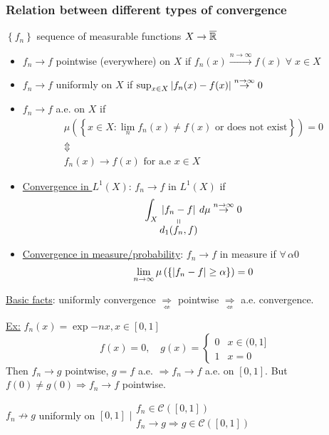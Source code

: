 \subsubsection*{Relation between different types of convergence}
\(\left\lbrace f_n \right\rbrace\) sequence of measurable functions \(X \to \barreal\)
\begin{itemize}
    \item \(f_n \to f\) pointwise (everywhere) on \(X\) if \(f_n(x) \overset{n \to \infty}{\to} f(x) \; \forall \; x \in X\)
    \item \(f_n \to f\) uniformly on \(X\) if \(\sup_{x \in X} \abs{f_n(x) - f(x)} \overset{n \to \infty}{\to} 0\)
    \item \(f_n \to f\) a.e. on \(X\) if 
    \[
        \begin{array}{c}
            \mu\left(\left\{ x \in X : \lim_n f_n(x) \neq f(x) \mbox{ or does not exist} \right\}\right) = 0 \\
            \Updownarrow \\
            f_n(x) \to f(x) \mbox{ for a.e } x \in X
        \end{array}
    \]
    \item \underline{Convergence in \(L^1(X)\)}: \(f_n \to f\) in \(L^1(X)\) if 
    \[
        \int_X \stackbelow{\abs{f_n - f}}{d_1(f_n, f)} \, d\mu \overset{n\to \infty}{\to} 0
    \]
    \item \underline{Convergence in measure/probability}: \(f_n \to f\) in measure if \(\forall \, \alpha 0\)
    \[
        \lim_{n\to \infty} \mu\left(\left\{ \abs{f_n - f} \geq \alpha \right\}\right) = 0
    \]
\end{itemize}
\underline{Basic facts}: uniformly convergence \(\underset{\displaystyle\not\Leftarrow}{\Rightarrow}\) pointwise \(\underset{\displaystyle\not\Leftarrow}{\Rightarrow}\) a.e. convergence.

\underline{Ex:} \(f_n (x) = \exp{-nx}, x \in [0,1]\)
\[
    f(x) = 0, \quad g(x) = \begin{cases}
        0 & x \in (0, 1]\\ 1 & x = 0
    \end{cases}
\]
Then \(f_n \to g\) pointwise, \(g = f\) a.e. \(\Longrightarrow f_n \to f\) a.e. on \([0,1]\). But \(f(0) \neq g(0) \Longrightarrow f_n \to f\) pointwise. 

\(f_n \not\to g\) uniformly on \([0,1]\) \(\bigg\lvert \begin{array}{l}
    f_n \in \mathcal{C}([0,1]) \\ f_n \to g \Longrightarrow g \in \mathcal{C}([0,1])
\end{array}\)

